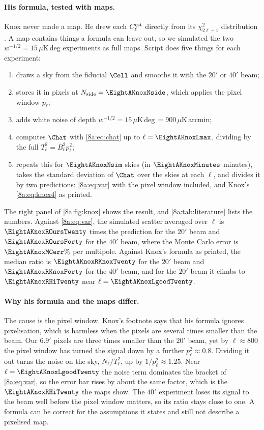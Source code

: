 \paragraph{His formula, tested with maps.}
Knox never made a map. He drew each $C^{\rm est}_\ell$ directly from its $\chi^2_{2\ell+1}$
distribution . A map contains things a formula can leave out, so we
simulated the two $w^{-1/2}=15\,\mu$K\,deg experiments as full maps. Script
 does five things for each experiment:
\begin{enumerate}
  \item draws a sky from the fiducial $\Cell$ and smooths it with the $20'$ or $40'$ beam;
  \item stores it in pixels at $N_{\rm side}=\EightAKnoxNside$, which applies the pixel window $p_\ell$;
  \item adds white noise of depth $w^{-1/2}=15\,\mu$K\,deg$\,=900\,\mu$K\,arcmin;
  \item computes $\Chat$ with \eqref{8a:eq:chat} up to $\ell=\EightAKnoxLmax$, dividing by the full
        $T_\ell^2=B_\ell^2p_\ell^2$;
  \item repeats this for $\EightAKnoxNsim$ skies (in $\EightAKnoxMinutes$ minutes), takes the standard
        deviation of $\Chat$ over the skies at each $\ell$, and divides it by two predictions:
        \eqref{8a:eq:var} with the pixel window included, and Knox's \eqref{8a:eq:knox4} as printed.
\end{enumerate}
The right panel of \cref{8a:fig:knox} shows the result, and \cref{8a:tab:literature} lists the
numbers. Against \eqref{8a:eq:var}, the simulated scatter averaged over $\ell$ is
$\EightAKnoxROursTwenty$ times the prediction for the $20'$ beam and $\EightAKnoxROursForty$ for the
$40'$ beam, where the Monte Carlo error is $\EightAKnoxMCerr\%$ per multipole. Against Knox's formula
as printed, the median ratio is $\EightAKnoxRKnoxTwenty$ for the $20'$ beam and
$\EightAKnoxRKnoxForty$ for the $40'$ beam, and for the $20'$ beam it climbs to
$\EightAKnoxRHiTwenty$ near $\ell=\EightAKnoxLgoodTwenty$.

\paragraph{Why his formula and the maps differ.}
The cause is the pixel window. Knox's footnote says that his formula ignores pixelisation, which
is harmless when the pixels are several times smaller than the beam. Our $6.9'$ pixels are three
times smaller than the $20'$ beam, yet by $\ell\approx800$ the pixel window has turned the signal
down by a further $p_\ell^2\approx0.8$. Dividing it out turns the noise on the sky,
$N_\ell/T_\ell^2$, up by $1/p_\ell^2\approx1.25$. Near $\ell=\EightAKnoxLgoodTwenty$ the noise term
dominates the bracket of \eqref{8a:eq:var}, so the error bar rises by about the same factor, which is
the $\EightAKnoxRHiTwenty$ the maps show. The $40'$ experiment loses its signal to the beam well
before the pixel window matters, so its ratio stays close to one. A formula can be correct for the
assumptions it states and still not describe a pixelised map.


